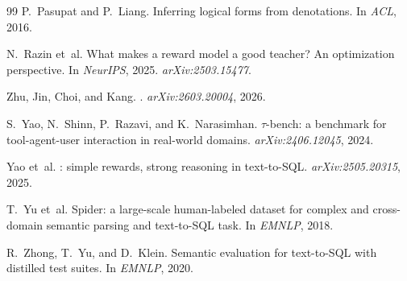 \documentclass{article}
\begin{document}
\begin{thebibliography}{99}
P.~Pasupat and P.~Liang.
\newblock Inferring logical forms from denotations.
\newblock In \emph{ACL}, 2016.

N.~Razin et~al.
\newblock What makes a reward model a good teacher? {An} optimization perspective.
\newblock In \emph{NeurIPS}, 2025. \emph{arXiv:2503.15477}.

Zhu, Jin, Choi, and Kang.
.
\newblock \emph{arXiv:2603.20004}, 2026.

S.~Yao, N.~Shinn, P.~Razavi, and K.~Narasimhan.
\newblock $\tau$-bench: a benchmark for tool-agent-user interaction in real-world domains.
\newblock \emph{arXiv:2406.12045}, 2024.

Yao et~al.
: simple rewards, strong reasoning in text-to-{SQL}.
\newblock \emph{arXiv:2505.20315}, 2025.

T.~Yu et~al.
\newblock Spider: a large-scale human-labeled dataset for complex and cross-domain semantic parsing and text-to-{SQL} task.
\newblock In \emph{EMNLP}, 2018.

R.~Zhong, T.~Yu, and D.~Klein.
\newblock Semantic evaluation for text-to-{SQL} with distilled test suites.
\newblock In \emph{EMNLP}, 2020.

\end{thebibliography}
\end{document}

